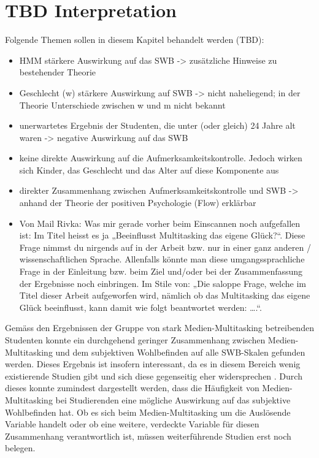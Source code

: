 \section{TBD Interpretation}\label{section.diskussion.interpretation}
Folgende Themen sollen in diesem Kapitel behandelt werden (TBD):
\begin{itemize}
    \item HMM stärkere Auswirkung auf das SWB -> zusätzliche Hinweise zu bestehender Theorie
    \item Geschlecht (w) stärkere Auswirkung auf SWB -> nicht naheliegend; in der Theorie Unterschiede zwischen w und m nicht bekannt
    \item unerwartetes Ergebnis der Studenten, die unter (oder gleich) 24 Jahre alt waren -> negative Auswirkung auf das SWB
    \item keine direkte Auswirkung auf die Aufmerksamkeitskontrolle. Jedoch wirken sich Kinder, das Geschlecht und das Alter auf diese Komponente aus
    \item direkter Zusammenhang zwischen Aufmerksamkeitskontrolle und SWB -> anhand der Theorie der positiven Psychologie (Flow) erklärbar
    \item Von Mail Rivka: Was mir gerade vorher beim Einscannen noch aufgefallen ist: Im Titel heisst es ja „Beeinflusst Multitasking das eigene Glück?“. Diese Frage nimmst du nirgends auf in der Arbeit bzw. nur in einer ganz anderen / wissenschaftlichen Sprache. Allenfalls könnte man diese umgangssprachliche Frage in der Einleitung bzw. beim Ziel und/oder bei der Zusammenfassung der Ergebnisse noch einbringen. Im Stile von: „Die saloppe Frage, welche im Titel dieser Arbeit aufgeworfen wird, nämlich ob das Multitasking das eigene Glück beeinflusst, kann damit wie folgt beantwortet werden: ….“.
\end{itemize}
Gemäss den Ergebnissen der Gruppe von stark Medien-Multitasking betreibenden Studenten konnte ein durchgehend geringer Zusammenhang zwischen Medien-Multitasking und dem subjektiven Wohlbefinden auf alle SWB-Skalen gefunden werden. Dieses Ergebnis ist insofern interessant, da es in diesem Bereich wenig existierende Studien gibt und sich diese gegenseitig eher widersprechen \cite{Pea2012, Shih2013}. Durch dieses konnte zumindest dargestellt werden, dass die Häufigkeit von Medien-Multitasking bei Studierenden eine mögliche Auswirkung auf das subjektive Wohlbefinden hat. Ob es sich beim Medien-Multitasking um die Auslösende Variable handelt oder ob eine weitere, verdeckte Variable für diesen Zusammenhang verantwortlich ist, müssen weiterführende Studien erst noch belegen. 
